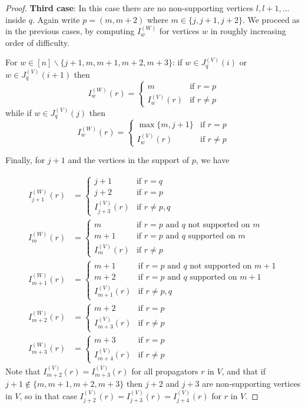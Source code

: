 \documentclass[11pt]{article}
\theoremstyle{remark}
\theoremstyle{definition}
\begin{document}
\begin{proof}
\textbf{Third case}: In this case there are no non-supporting vertices $l, l+1, \ldots$ inside $q$.  Again write $p=(m, m+2)$ where $m\in \{j, j+1, j+2\}$. We proceed as in the previous cases, by computing $I^{(W)}_w$ for vertices $w$ in roughly increasing order of difficulty.

For $w \in [n]\backslash\{j+1,m,m+1,m+2,m+3\}$: if $w\in J_q^{(V)}(i)$ or $w\in J_q^{(V)}(i+1)$ then
    \[
    I_w^{(W)}(r) =  \begin{cases}
        m & \text{if } r=p \\
        I_{w}^{(V)}(r) & \text{if } r\neq p
      \end{cases} 
    \]
    while if $w\in J_q^{(V)}(j)$ then
    \[
    I_w^{(W)}(r) =  \begin{cases}
        \max\{m, j+1\} & \text{if } r=p \\
        I_{w}^{(V)}(r) & \text{if } r\neq p
      \end{cases} 
    \]

Finally, for $j+1$ and the vertices in the support of $p$, we have

\begin{align*}
  I_{j+1}^{(W)}(r) &= \begin{cases}
    j+1 & \text{if } r=q\\
    j+2 & \text{if } r=p\\
    I_{j+3}^{(V)}(r) & \text{if } r\neq p,q
  \end{cases}\\
  I_m^{(W)}(r) &= \begin{cases}
    m & \text{if $r=p$ and $q$ not supported on $m$}\\
    m+1 & \text{if $r=p$ and $q$ supported on $m$}\\
    I_{m}^{(V)}(r) & \text{if } r\neq p
  \end{cases}\\
  I_{m+1}^{(W)}(r) & = \begin{cases}
    m+1 & \text{if $r=p$ and $q$ not supported on $m+1$} \\
    m+2 & \text{if $r=p$ and $q$ supported on $m+1$} \\
    I_{m+1}^{(V)}(r) & \text{if } r\neq p,q
  \end{cases}\\
  I_{m+2}^{(W)}(r) & = \begin{cases}
    m+2 & \text{if } r=p \\
    I_{m+3}^{(V)}(r) & \text{if } r\neq p
  \end{cases}\\
  I_{m+3}^{(W)}(r) & = \begin{cases}
    m+3 & \text{if } r=p \\
    I_{m+4}^{(V)}(r) & \text{if } r\neq p
  \end{cases}
\end{align*}
Note that $I_{m+2}^{(V)}(r) = I_{m+3}^{(V)}(r)$ for all propagators $r$ in $V$, and that if $j+1\not\in\{m, m+1, m+2, m+3\}$ then $j+2$ and $j+3$ are non-supporting vertices in $V$, so in that case $I_{j+2}^{(V)}(r) = I_{j+3}^{(V)}(r) = I_{j+4}^{(V)}(r)$ for $r$ in $V$. 


\end{proof}
\end{document}
